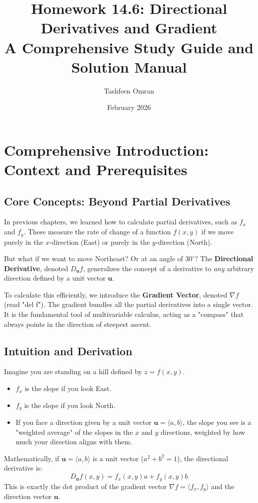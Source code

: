 \documentclass{article}
\title{\textbf{Homework 14.6: Directional Derivatives and Gradient}\\ \large A Comprehensive Study Guide and Solution Manual}
\author{Tashfeen Omran}
\date{February 2026}
\begin{document}
\maketitle
\tableofcontents
\newpage

\section{Comprehensive Introduction: Context and Prerequisites}

\subsection{Core Concepts: Beyond Partial Derivatives}
In previous chapters, we learned how to calculate partial derivatives, such as $f_x$ and $f_y$. These measure the rate of change of a function $f(x, y)$ if we move purely in the $x$-direction (East) or purely in the $y$-direction (North).

But what if we want to move Northeast? Or at an angle of $30^\circ$?
The \textbf{Directional Derivative}, denoted $D_{\mathbf{u}}f$, generalizes the concept of a derivative to \textit{any} arbitrary direction defined by a unit vector $\mathbf{u}$.

To calculate this efficiently, we introduce the \textbf{Gradient Vector}, denoted $\nabla f$ (read "del f"). The gradient bundles all the partial derivatives into a single vector. It is the fundamental tool of multivariable calculus, acting as a "compass" that always points in the direction of steepest ascent.

\subsection{Intuition and Derivation}
Imagine you are standing on a hill defined by $z = f(x, y)$.
\begin{itemize}
    \item $f_x$ is the slope if you look East.
    \item $f_y$ is the slope if you look North.
    \item If you face a direction given by a unit vector $\mathbf{u} = \langle a, b \rangle$, the slope you see is a "weighted average" of the slopes in the $x$ and $y$ directions, weighted by how much your direction aligns with them.
\end{itemize}

Mathematically, if $\mathbf{u} = \langle a, b \rangle$ is a unit vector ($a^2 + b^2 = 1$), the directional derivative is:
\[ D_{\mathbf{u}}f(x, y) = f_x(x, y)a + f_y(x, y)b \]
This is exactly the dot product of the gradient vector $\nabla f = \langle f_x, f_y \rangle$ and the direction vector $\mathbf{u}$.
\end{document}
